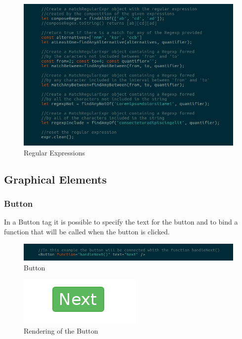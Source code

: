 \begin{figure}[H]
	\centering
	\includegraphics[width=14cm]{../../documenti/UserManualFramework/framework_model/6framework_model_regexp2.png}
	\caption{Regular Expressions}
\end{figure}

\subsection{Graphical Elements}
\subsubsection{Button}
In a Button tag it is possible to specify the text for the button and to bind a function that will be called when the button is clicked.
\begin{figure}[H]
	\centering
	\includegraphics[width=14cm]{../../documenti/UserManualFramework/framework_view/11framework_view_button.png}
	\caption{Button}
\end{figure}

\begin{figure}[H]
	\centering
	\includegraphics[width=6cm]{../../documenti/UserManualFramework/graphical_elements/buttonGE.png}
	\caption{Rendering of the Button}
\end{figure}

